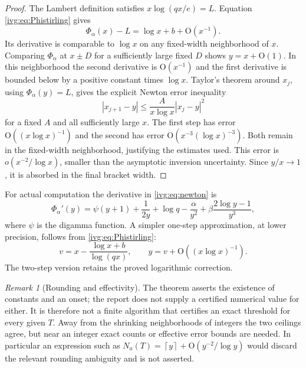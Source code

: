 \documentclass[11pt,letterpaper]{article}
\theoremstyle{definition}\newtheorem{definition}[theorem]{Definition}
\theoremstyle{remark}\newtheorem{remark}[theorem]{Remark}
\newcommand{\OO}{\mathrm O}
\newcommand{\ceil}[1]{\left\lceil #1\right\rceil}
\begin{document}
\begin{proof}
The Lambert definition satisfies $x\log(qx/e)=L$. Equation \eqref{ivg:eq:Phistirling} gives
\[
 \Phi_\alpha(x)-L=\log x+b+\OO(x^{-1}).
\]
Its derivative is comparable to $\log x$ on any fixed-width neighborhood of $x$. Comparing $\Phi_\alpha$ at $x\pm D$ for a sufficiently large fixed $D$ shows $y=x+\OO(1)$. In this neighborhood the second derivative is $\OO(x^{-1})$ and the first derivative is bounded below by a positive constant times $\log x$. Taylor's theorem around $x_j$, using $\Phi_\alpha(y)=L$, gives the explicit Newton error inequality
\begin{equation}\label{ivg:eq:newtonbound}
 |x_{j+1}-y|\le\frac{A}{x\log x}|x_j-y|^2
\end{equation}
for a fixed $A$ and all sufficiently large $x$. The first step has error $\OO((x\log x)^{-1})$ and the second has error $\OO(x^{-3}(\log x)^{-3})$. Both remain in the fixed-width neighborhood, justifying the estimates used. This error is $o(x^{-2}/\log x)$, smaller than the asymptotic inversion uncertainty. Since $y/x\to1$, it is absorbed in the final bracket width.
\end{proof}
For actual computation the derivative in \eqref{ivg:eq:newton} is
\begin{equation}\label{ivg:eq:Phiexplicitderivative}
 \Phi_\alpha'(y)=\psi(y+1)+\frac1{2y}+\log q-\frac\alpha{y^2}
 +\beta\frac{2\log y-1}{y^3},
\end{equation}
where $\psi$ is the digamma function. A simpler one-step approximation, at lower precision, follows from \eqref{ivg:eq:Phistirling}:
\[
 v=x-\frac{\log x+b}{\log(qx)},\qquad
 y=v+\OO((x\log x)^{-1}).
\]
The two-step version retains the proved logarithmic correction.

\begin{remark}[Rounding and effectivity]
The theorem asserts the existence of constants and an onset; the report does not supply a certified numerical value for either. It is therefore not a finite algorithm that certifies an exact threshold for every given $T$. Away from the shrinking neighborhoods of integers the two ceilings agree, but near an integer exact counts or effective error bounds are needed. In particular an expression such as $N_a(T)=\ceil{y}+\OO(y^{-2}/\log y)$ would discard the relevant rounding ambiguity and is not asserted.
\end{remark}
\end{document}
